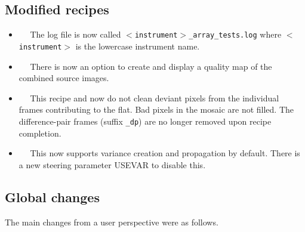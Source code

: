 \documentclass[twoside,11pt,nolof]{starlink}
\begin{document}
\subsection{Modified recipes}
\begin{itemize}
  \item {}~~
    The log file is now called {\tt$<$instrument$>$\_array\_tests.log}
    where {\tt$<$instrument$>$} is the lowercase instrument name.
  \item {}~~
    There is now an option to create and display a quality map of the
    combined source images.
  \item {}~~
    This recipe and
    now do not clean deviant pixels from the individual frames
    contributing to the flat.  Bad pixels in the mosaic are not filled.
    The difference-pair frames (suffix {\tt\_dp}) are no longer removed
    upon recipe completion.
  \item {}~~
    This now supports variance creation and propagation by default.
    There is a new steering parameter USEVAR to disable this.
\end{itemize}

\subsection{Global changes}

The main changes from a user perspective were as follows.
\end{document}
